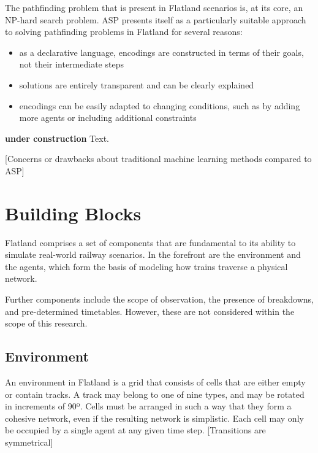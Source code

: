 \documentclass[11pt]{article}
\begin{document}

The pathfinding problem that is present in Flatland scenarios is, at its core, an NP-hard search problem.  ASP presents itself as a particularly suitable approach to solving pathfinding problems in Flatland for several reasons:
\begin{itemize}
	\item as a declarative language, encodings are constructed in terms of their goals, not their intermediate steps
	\item solutions are entirely transparent and can be clearly explained
	\item encodings can be easily adapted to changing conditions, such as by adding more agents or including additional constraints
\end{itemize}

\noindent \textbf{under construction} Text. \medskip

[Concerns or drawbacks about traditional machine learning methods compared to ASP]

\section{Building Blocks}
Flatland comprises a set of components that are fundamental to its ability to simulate real-world railway scenarios.  In the forefront are the environment and the agents, which form the basis of modeling how trains traverse a physical network.

Further components include the scope of observation, the presence of breakdowns, and pre-determined timetables.  However, these are not considered within the scope of this research.

\subsection{Environment}
\label{sec:Environment}
An environment in Flatland is a grid that consists of cells that are either empty or contain tracks.  A track may belong to one of nine types, and may be rotated in increments of 90º.  Cells must be arranged in such a way that they form a cohesive network, even if the resulting network is simplistic.  Each cell may only be occupied by a single agent at any given time step.  [Transitions are symmetrical]
\end{document}
